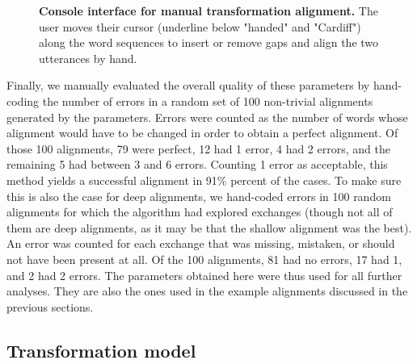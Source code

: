 \begin{figure}[!ht]
  \centering

  \caption[Console interface for manual transformation alignment]{
  \textbf{Console interface for manual transformation alignment.}
  The user moves their cursor (underline below "handed" and "Cardiff") along the word sequences to insert or remove gaps and align the two utterances by hand.
  }
  \label{fig:gistr-goldcli}
\end{figure}

Finally, we manually evaluated the overall quality of these parameters
by hand-coding the number of errors in a random set of 100 non-trivial
alignments generated by the parameters. Errors were counted as the
number of words whose alignment would have to be changed in order to
obtain a perfect alignment. Of those 100 alignments, 79 were perfect, 12
had 1 error, 4 had 2 errors, and the remaining 5 had between 3 and 6
errors. Counting 1 error as acceptable, this method yields a successful
alignment in 91\% percent of the cases. To make sure this is also the
case for deep alignments, we hand-coded errors in 100 random alignments
for which the algorithm had explored exchanges (though not all of them
are deep alignments, as it may be that the shallow alignment was the
best). An error was counted for each exchange that was missing,
mistaken, or should not have been present at all. Of the 100 alignments,
81 had no errors, 17 had 1, and 2 had 2 errors. The parameters obtained
here were thus used for all further analyses. They are also the ones
used in the example alignments discussed in the previous sections.

\subsection{Transformation model}\label{transformation-model}

